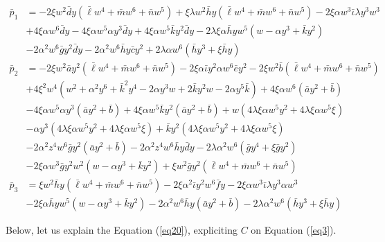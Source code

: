 \documentclass[12pt]{article}
\numberwithin{table}{section}
\begin{document}
\begin{align}
\bar p_1 &= - 2\xi w^2\bar d y (\bar \ell  w^4 + \bar m  w^6 + \bar n  w^5) + \xi \lambda w^2\bar h  y(\bar \ell  w^4 + \bar m  w^6 + \bar n  w^5)- 2\xi \alpha w^3 \bar \iota \lambda y^3 w^3  \nonumber\\
&+  4 \xi\alpha w^6  \bar d y - 4 \xi\alpha w^5\alpha y^3 \bar d y + 4 \xi\alpha w^5\bar k y^2 \bar d y -2 \lambda\xi\alpha \bar h  y w^5  (  w - \alpha y^3  + \bar k y^2 ) \nonumber\\
&-2 \alpha^2 w^6\bar g y^2 \bar d y 
-2 \alpha^2 w^6\bar h y \bar c y^2
+ 2 \lambda \alpha w^6 (\bar h  y^3 + \xi \bar h  y) \\
\bar p_2 &= -2\xi w^2\bar a  y^2(\bar \ell  w^4 + \bar m  w^6 + \bar n  w^5) -2\xi \alpha \bar \iota y^2\alpha w^6 \bar e y^2 - 2\xi w^2\bar b (\bar \ell  w^4 + \bar m  w^6 + \bar n  w^5)  \nonumber\\
&+4\xi^2 w^4 (  w^2 + \alpha^2 y^6  + \bar k^2 y^4  - 2  \alpha y^3  w + 2 \bar k y^2 w - 2 \alpha y^5  \bar k) +  4 \xi\alpha w^6  (\bar a  y^2 + \bar b ) \nonumber\\
&- 4 \xi\alpha w^5\alpha y^3 (\bar a  y^2 + \bar b ) + 4 \xi\alpha w^5\bar k y^2 (\bar a  y^2 + \bar b ) +  w (4 \lambda \xi \alpha  w^5 y^2  + 4 \lambda \xi \alpha  w^5 \xi ) \nonumber\\
&- \alpha y^3  (4 \lambda \xi \alpha  w^5 y^2  + 4 \lambda \xi \alpha  w^5 \xi ) + \bar k y^2  (4 \lambda \xi \alpha  w^5 y^2  + 4 \lambda \xi \alpha  w^5 \xi )  \nonumber\\
&-2 \alpha^2 z^4w^6\bar g y^2 (\bar a  y^2 + \bar b ) -2 \alpha^2 z^4w^6\bar h y \bar d y - 2 \lambda \alpha^2 w^6 (\bar g y^4 + \xi \bar g y^2)\nonumber\\
&-2 \xi\alpha w^3 \bar g y^2  w^2 (  w - \alpha y^3  + \bar k y^2 )+ \xi  w^2\bar g y^2 (\bar \ell  w^4 + \bar m  w^6 + \bar n  w^5) \\
\bar p_3 &= \xi w^2\bar h  y(\bar \ell  w^4 + \bar m  w^6 + \bar n  w^5)
-2\xi \alpha^2 \bar \iota y^2 w^6 \bar f  y 
- 2\xi \alpha w^3 \bar \iota \lambda y^3 \alpha  w^3 \nonumber\\
&-2 \xi\alpha \bar h  y w^5 (  w - \alpha y^3  + \bar k y^2 ) 
-2 \alpha^2 w^6\bar h y (\bar a  y^2 + \bar b ) - 2 \lambda \alpha^2 w^6 (\bar h  y^3 + \xi \bar h  y)
\end{align}

Below, let us explain the Equation (\ref{eq20}), expliciting $C$ on Equation (\ref{eq3}).
\end{document}
